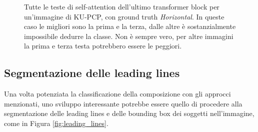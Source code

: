 \begin{figure}
    \hspace{3mm}
    \vspace{2mm}

    
    
    \caption{Tutte le teste di self-attention dell'ultimo transformer block per un'immagine di KU-PCP, con ground truth \textit{Horizontal}. In queste caso le migliori sono la prima e la terza, dalle altre è sostanzialmente impossibile dedurre la classe. Non è sempre vero, per altre immagini la prima e terza testa potrebbero essere le peggiori.}
    \label{fig:attention_heads_ex}
\end{figure}

\subsection{Segmentazione delle leading lines}
Una volta potenziata la classificazione della composizione con gli approcci menzionati, uno sviluppo interessante potrebbe essere quello di procedere alla segmentazione delle leading lines e delle bounding box dei soggetti nell'immagine, come in Figura \ref{fig:leading_lines}. 

